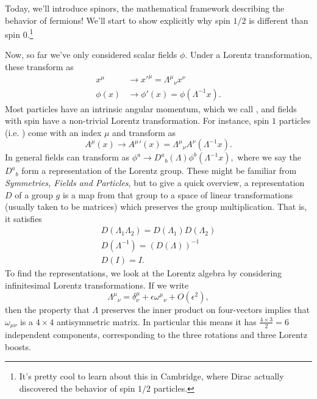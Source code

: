 Today, we'll introduce spinors, the mathematical framework describing the behavior of fermions! We'll start to show explicitly why spin $1/2$ is different than spin $0$.\footnote{It's pretty cool to learn about this in Cambridge, where Dirac actually discovered the behavior of spin $1/2$ particles.}

Now, so far we've only considered scalar fields $\phi$. Under a Lorentz transformation, these transform as
\begin{align*}
    x^\mu & \to {x'}^\mu = {\Lambda^\mu}_\nu x^\nu\\
    \phi(x) & \to \phi'(x)=\phi(\Lambda^{-1}x).
\end{align*}
Most particles have an intrinsic angular momentum, which we call , and fields with spin have a non-trivial Lorentz transformation. For instance, spin $1$ particles (i.e. ) come with an index $\mu$ and transform as
$$A^\mu(x)\to {A^\mu}'(x)={\Lambda^\mu}_\nu A^\nu(\Lambda^{-1} x).$$
In general fields can transform as $\phi^a \to {D^a}_b(\Lambda) \phi^b(\Lambda^{-1}x),$
where we say the ${D^a}_b$ form a representation of the Lorentz group. These might be familiar from \emph{Symmetries, Fields and Particles}, but to give a quick overview, a representation $D$ of a group $g$ is a map from that group to a space of linear transformations (usually taken to be matrices) which preserves the group multiplication. That is, it satisfies
\begin{gather*}
    D(\Lambda_1\Lambda_2)=D(\Lambda_1)D(\Lambda_2)\\
    D(\Lambda^{-1})=(D(\Lambda))^{-1}\\
    D(I)= I.
\end{gather*}
To find the representations, we look at the Lorentz algebra by considering infinitesimal Lorentz transformations. If we write
$${\Lambda^\mu}_\nu=\delta^\mu_\nu+\epsilon {\omega^\mu}_\nu+O(\epsilon^2),$$
then the property that $\Lambda$ preserves the inner product on four-vectors implies that $\omega_{\mu\nu}$ is a $4\times 4$ antisymmetric matrix. In particular this means it has $\frac{4\times 3}{2}=6$ independent components, corresponding to the three rotations and three Lorentz boosts.

